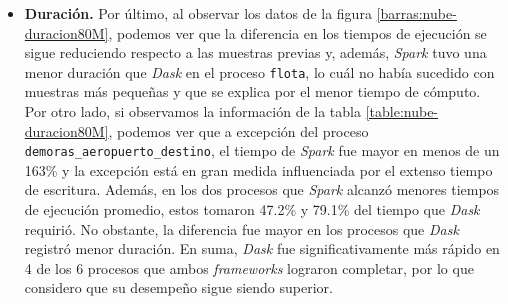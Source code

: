 \begin{itemize}
	\item \textbf{Duración.} Por último, al observar los datos de la figura \ref{barras:nube-duracion80M}, podemos ver que la diferencia en los tiempos de ejecución se sigue reduciendo respecto a las muestras previas y, además, \textit{Spark} tuvo una menor duración que \textit{Dask} en el proceso \texttt{flota}, lo cuál no había sucedido con muestras más pequeñas y que se explica por el menor tiempo de cómputo. Por otro lado, si observamos la información de la tabla \ref{table:nube-duracion80M}, podemos ver que a excepción del proceso \texttt{demoras\_aeropuerto\_destino}, el tiempo de \textit{Spark} fue mayor en menos de un 163\% y la excepción está en gran medida influenciada por el extenso tiempo de escritura. Además, en los dos procesos que \textit{Spark} alcanzó menores tiempos de ejecución promedio, estos tomaron 47.2\% y 79.1\% del tiempo que \textit{Dask} requirió. No obstante, la diferencia fue mayor en los procesos que \textit{Dask} registró menor duración. En suma, \textit{Dask} fue significativamente más rápido en 4 de los 6 procesos que ambos \textit{frameworks} lograron completar, por lo que considero que su desempeño sigue siendo superior.
	
\end{itemize}

